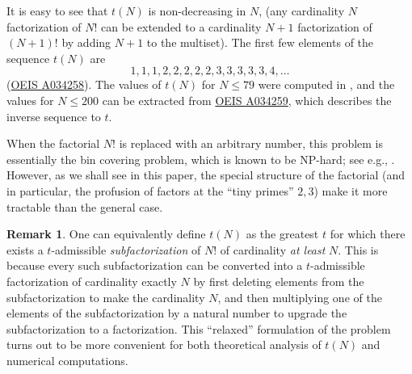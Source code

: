 \documentclass[12pt,a4paper,reqno]{amsart}
\numberwithin{equation}{section}
\theoremstyle{plain}
\theoremstyle{definition}
\newtheorem{remark}[theorem]{Remark}
\begin{document}
It is easy to see that $t(N)$ is non-decreasing in $N$, (any cardinality $N$ factorization of $N!$ can be extended to a cardinality $N+1$ factorization of $(N+1)!$ by adding $N+1$ to the multiset).  The first few elements of the sequence $t(N)$ are
$$ 1,1,1,2,2,2,2,2,3,3,3,3,3,4, \dots$$
(\href{https://oeis.org/A034258}{OEIS A034258}). The values of $t(N)$ for $N \leq 79$ were computed in \cite{guy}, and the values for $N \leq 200$ can be extracted from \href{https://oeis.org/A034259}{OEIS A034259}, which describes the inverse sequence to $t$.

When the factorial $N!$ is replaced with an arbitrary number, this problem is essentially the bin covering problem, which is known to be NP-hard; see e.g., \cite{bincover}.  However, as we shall see in this paper, the special structure of the factorial (and in particular, the profusion of factors at the ``tiny primes'' $2,3$) make it more tractable than the general case.

\begin{remark}\label{subfac}  One can equivalently define $t(N)$ as the greatest $t$ for which there exists a $t$-admissible \emph{subfactorization} of $N!$ of cardinality \emph{at least} $N$.  This is because every such subfactorization can be converted into a $t$-admissible factorization of cardinality exactly $N$ by first deleting elements from the subfactorization to make the cardinality $N$, and then multiplying one of the elements of the subfactorization by a natural number to upgrade the subfactorization to a factorization.  This ``relaxed'' formulation of the problem turns out to be more convenient for both theoretical analysis of $t(N)$ and numerical computations.
\end{remark}
\end{document}
